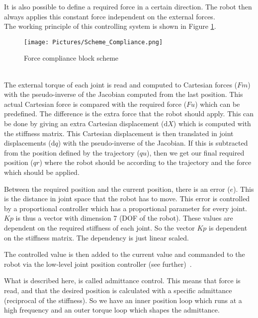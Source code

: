 \documentclass[11pt,a4paper]{report}
\begin{document}
It is also possible to define a required force in a certain direction. The robot then always applies this constant force independent on the external forces. \\
The working principle of this controlling system is shown in Figure \ref{fig:ComplianceBlockScheme}.
\begin{figure}[!ht]
	\centering
	\texttt{[image: Pictures/Scheme\_Compliance.png]}
	\caption{Force compliance block scheme}
	\label{fig:ComplianceBlockScheme}
\end{figure}\\
The external torque of each joint is read and computed to Cartesian forces ($Fm$) with the pseudo-inverse of the Jacobian computed from the last position. This actual Cartesian force is compared with the required force ($Fu$) which can be predefined. The difference is the extra force that the robot should apply. This can be done by giving an extra Cartesian displacement ($\mathrm{d}X$) which is computed with the stiffness matrix. This Cartesian displacement is then translated in joint displacements ($\mathrm{d}q$) with the pseudo-inverse of the Jacobian. If this is subtracted from the position defined by the trajectory ($qu$), then we get our final required position ($qr$) where the robot should be according to the trajectory and the force which should be applied.

Between the required position and the current position, there is an error ($e$). This is the distance in joint space that the robot has to move. This error is controlled by a proportional controller which has a proportional parameter for every joint. $Kp$ is thus a vector with dimension 7 (DOF of the robot). These values are dependent on the required stiffness of each joint. So the vector $Kp$ is dependent on the stiffness matrix. The dependency is just linear scaled.

The controlled value is then added to the current value and commanded to the robot via the low-level joint position controller (see further)~\cite{ComplianceController}.

What is described here, is called admittance control. This means that force is read, and that the desired position is calculated with a specific admittance (reciprocal of the stiffness). So we have an inner position loop which runs at a high frequency and an outer torque loop which shapes the admittance. 
\end{document}
